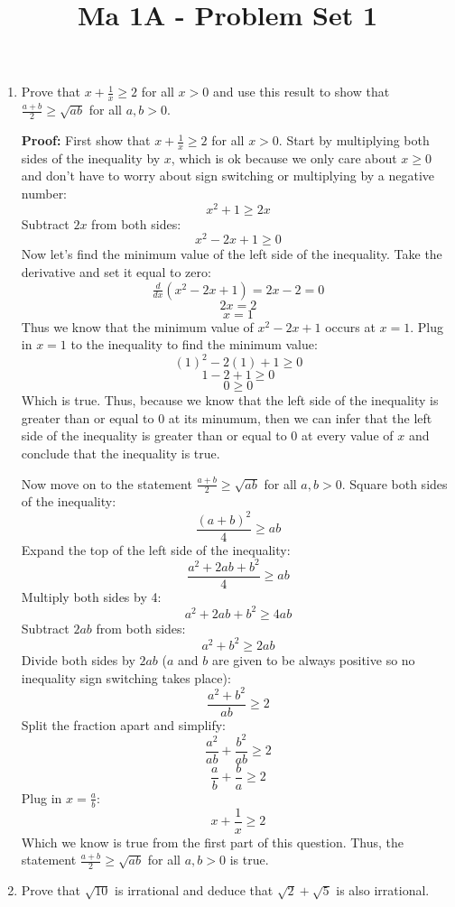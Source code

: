 \documentclass[11pt]{article}
\title{\vspace{-0.7cm}Ma 1A - Problem Set 1}
\date{}
\begin{document}
\maketitle

\begin{enumerate}

\item
Prove that $x + \frac 1x \geq 2$ for all $x > 0$ and use this result to show that $\frac{a+b}{2} \geq \sqrt{ab}$ for all $a, b > 0$.

\bigskip 
\textbf{Proof: } First show that $x + \frac 1x \geq 2$ for all $x > 0$. Start by multiplying both sides of the inequality by $x$, which is ok because we only care about $x\geq 0$ and don't have to worry about sign switching or multiplying by a negative number: 
\[x^2 + 1 \geq 2x\]
Subtract $2x$ from both sides: 
\[x^2 -2x + 1 \geq 0 \]
Now let's find the minimum value of the left side of the inequality. Take the derivative and set it equal to zero: 
\[\tfrac{d}{dx} (x^2-2x+1 )= 2x -2 = 0 \]
\[2x = 2 \]
\[x = 1 \]
Thus we know that the minimum value of $x^2 - 2x + 1$ occurs at $x = 1$. Plug in $x = 1$ to the inequality to find the minimum value: 
\[(1)^2 - 2(1) +1 \geq 0 \]
\[ 1 - 2 + 1 \geq 0\]
\[0 \geq 0 \]
Which is true. Thus, because we know that the left side of the inequality is greater than or equal to $0$ at its minumum, then we can infer that the left side of the inequality is greater than or equal to $0$ at every value of $x$ and conclude that the inequality is true. 

\medskip

Now move on to the statement $\frac{a+b}{2} \geq \sqrt{ab}$ for all $a, b > 0$. Square both sides of the inequality: 
\[\frac{(a+b)^2}{4} \geq ab \]
Expand the top of the left side of the inequality: 
\[\frac{a^2 + 2ab + b^2}{4} \geq ab \]
Multiply both sides by 4: 
\[a^2 + 2ab + b^2 \geq 4ab\]
Subtract $2ab$ from both sides:
\[ a^2 + b^2 \geq 2ab\]
Divide both sides by $2ab$ ($a$ and $b$ are given to be always positive so no inequality sign switching takes place):
\[\frac{a^2 + b^2}{ab} \geq 2 \]
Split the fraction apart and simplify:
\[\frac{a^2}{ab} + \frac{b^2}{ab} \geq 2\]
\[\frac{a}{b}+ \frac{b}{a} \geq 2 \]
Plug in $x = \frac{a}{b}$:
\[x + \frac{1}{x} \geq 2 \] 
Which we know is true from the first part of this question. Thus, the statement $\frac{a+b}{2} \geq \sqrt{ab}$ for all $a, b > 0$ is true. 

\bigskip
\rightline{$\Box$}

\item
Prove that $\sqrt{10}$ is irrational and deduce that $\sqrt{2} + \sqrt{5}$ is also irrational.


\end{enumerate}
\end{document}
